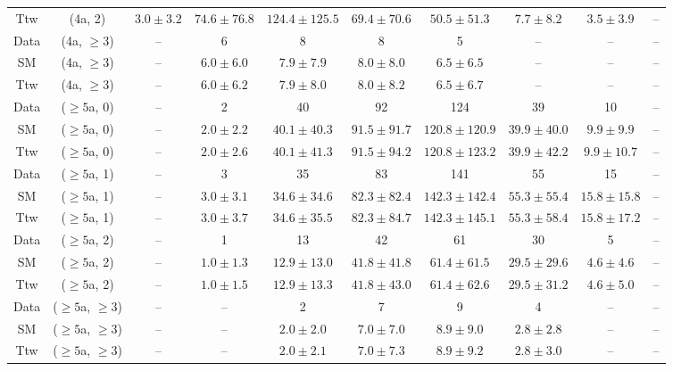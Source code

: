 \begin{table}[h!]
{\begin{tabular}{cccccccccc}
	Ttw & (4a, 2) & $3.0\pm 3.2$ & $74.6\pm 76.8$ & $124.4\pm 125.5$ & $69.4\pm 70.6$ & $50.5\pm 51.3$ & $7.7\pm 8.2$ & $3.5\pm 3.9$ & -- \\[0.5ex] 
	Data & (4a, $\ge3$) & -- & 6 & 8 & 8 & 5 & -- & -- & -- \\[0.5ex] 
	SM & (4a, $\ge3$) & -- & $6.0\pm 6.0$ & $7.9\pm 7.9$ & $8.0\pm 8.0$ & $6.5\pm 6.5$ & -- & -- & -- \\[0.5ex] 
	Ttw & (4a, $\ge3$) & -- & $6.0\pm 6.2$ & $7.9\pm 8.0$ & $8.0\pm 8.2$ & $6.5\pm 6.7$ & -- & -- & -- \\[0.5ex] 
	Data & ($\ge5$a, 0) & -- & 2 & 40 & 92 & 124 & 39 & 10 & -- \\[0.5ex] 
	SM & ($\ge5$a, 0) & -- & $2.0\pm 2.2$ & $40.1\pm 40.3$ & $91.5\pm 91.7$ & $120.8\pm 120.9$ & $39.9\pm 40.0$ & $9.9\pm 9.9$ & -- \\[0.5ex] 
	Ttw & ($\ge5$a, 0) & -- & $2.0\pm 2.6$ & $40.1\pm 41.3$ & $91.5\pm 94.2$ & $120.8\pm 123.2$ & $39.9\pm 42.2$ & $9.9\pm 10.7$ & -- \\[0.5ex] 
	Data & ($\ge5$a, 1) & -- & 3 & 35 & 83 & 141 & 55 & 15 & -- \\[0.5ex] 
	SM & ($\ge5$a, 1) & -- & $3.0\pm 3.1$ & $34.6\pm 34.6$ & $82.3\pm 82.4$ & $142.3\pm 142.4$ & $55.3\pm 55.4$ & $15.8\pm 15.8$ & -- \\[0.5ex] 
	Ttw & ($\ge5$a, 1) & -- & $3.0\pm 3.7$ & $34.6\pm 35.5$ & $82.3\pm 84.7$ & $142.3\pm 145.1$ & $55.3\pm 58.4$ & $15.8\pm 17.2$ & -- \\[0.5ex] 
	Data & ($\ge5$a, 2) & -- & 1 & 13 & 42 & 61 & 30 & 5 & -- \\[0.5ex] 
	SM & ($\ge5$a, 2) & -- & $1.0\pm 1.3$ & $12.9\pm 13.0$ & $41.8\pm 41.8$ & $61.4\pm 61.5$ & $29.5\pm 29.6$ & $4.6\pm 4.6$ & -- \\[0.5ex] 
	Ttw & ($\ge5$a, 2) & -- & $1.0\pm 1.5$ & $12.9\pm 13.3$ & $41.8\pm 43.0$ & $61.4\pm 62.6$ & $29.5\pm 31.2$ & $4.6\pm 5.0$ & -- \\[0.5ex] 
	Data & ($\ge5$a, $\ge3$) & -- & -- & 2 & 7 & 9 & 4 & -- & -- \\[0.5ex] 
	SM & ($\ge5$a, $\ge3$) & -- & -- & $2.0\pm 2.0$ & $7.0\pm 7.0$ & $8.9\pm 9.0$ & $2.8\pm 2.8$ & -- & -- \\[0.5ex] 
	Ttw & ($\ge5$a, $\ge3$) & -- & -- & $2.0\pm 2.1$ & $7.0\pm 7.3$ & $8.9\pm 9.2$ & $2.8\pm 3.0$ & -- & -- \\[0.5ex] 
	\hline
	\hline
\end{tabular}}
\end{table}
